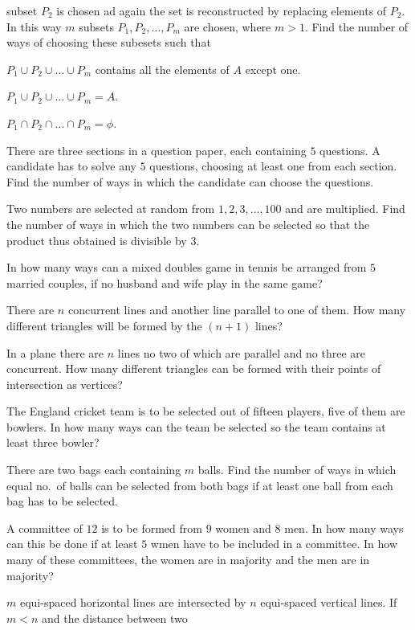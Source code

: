   subset $P_2$ is chosen ad again the set is reconstructed by replacing elements of $P_2$. In this way $m$ subsets $P_1, P_2,
  \ldots, P_m$ are chosen, where $m > 1$. Find the number of ways of choosing these subesets such that
  \startitemize[i]
  \item $P_1\cup P_2\cup\ldots\cup P_m$ contains all the elements of $A$ except one.
  \item $P_1\cup P_2\cup\ldots\cup P_m = A$.
  \item $P_1\cap P_2\cap\ldots\cap P_m = \phi$.
  \stopitemize
\item There are three sections in a question paper, each containing $5$ questions. A candidate has to solve any $5$ questions,
  choosing at least one from each section. Find the number of ways in which the candidate can choose the questions.
\item Two numbers are selected at random from $1, 2, 3, \ldots, 100$ and are multiplied. Find the number of ways in which the two
  numbers can be selected so that the product thus obtained is divisible by $3$.
\item In how many ways can a mixed doubles game in tennis be arranged from $5$ married couples, if no husband and wife play in the
  same game?
\item There are $n$ concurrent lines and another line parallel to one of them. How many different triangles will be formed by the
  $(n + 1)$ lines?
\item In a plane there are $n$ lines no two of which are parallel and no three are concurrent. How many different triangles can be
  formed with their points of intersection as vertices?
\item The England cricket team is to be selected out of fifteen players, five of them are bowlers. In how many ways can the team be
  selected so the team contains at least three bowler?
\item There are two bags each containing $m$ balls. Find the number of ways in which equal no.\ of balls can be selected from both
  bags if at least one ball from each bag has to be selected.
\item A committee of $12$ is to be formed from $9$ women and $8$ men. In how many ways can this be done if at least $5$ wmen have
  to be included in a committee. In how many of these committees, the women are in majority and the men are in majority?
\item $m$ equi-spaced horizontal lines are intersected by $n$ equi-spaced vertical lines. If $m < n$ and the distance between two
